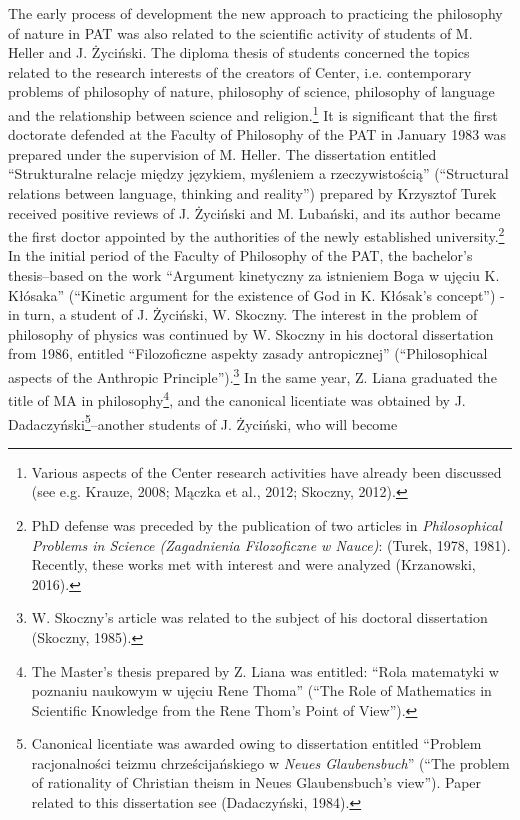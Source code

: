 \documentclass[a4paper]{article}
\begin{document}
The early process of development the new approach to practicing the philosophy of nature in PAT was also related to the
scientific activity of students of M. Heller and J. Życiński. The diploma thesis of students concerned the topics
related to the research interests of the creators of Center, i.e. contemporary problems of philosophy of nature,
philosophy of science, philosophy of language and the relationship between science and religion.\footnote{ Various
aspects of the Center research activities have already been discussed \label{ref:RNDp1PNQqixjX}(see e.g. Krauze, 2008;
Mączka et al., 2012; Skoczny, 2012).} It is significant that the first doctorate defended at the Faculty of Philosophy
of the PAT in January 1983 was prepared under the supervision of M. Heller. The dissertation entitled “Strukturalne
relacje między językiem, myśleniem a rzeczywistością” (“Structural relations between language, thinking and reality”)
prepared by Krzysztof Turek received positive reviews of J. Życiński and M. Lubański, and its author became the first
doctor appointed by the authorities of the newly established university.\footnote{ PhD defense was preceded by the
publication of two articles in \textit{Philosophical Problems in Science (Zagadnienia Filozoficzne w Nauce)}:
\label{ref:RNDKeSlQokX67}(Turek, 1978, 1981). Recently, these works met with interest and were analyzed
\label{ref:RNDyOBxtnZucT}(Krzanowski, 2016).} In the initial period of the Faculty of Philosophy of the PAT, the
bachelor’s thesis–based on the work “Argument kinetyczny za istnieniem Boga w ujęciu K. Kłósaka” (“Kinetic argument for
the existence of God in K. Kłósak's concept”) - in turn, a student of J. Życiński, W. Skoczny. The interest in the
problem of philosophy of physics was continued by W. Skoczny in his doctoral dissertation from 1986, entitled
“Filozoficzne aspekty zasady antropicznej” (“Philosophical aspects of the Anthropic Principle”).\footnote{ W. Skoczny’s
article was related to the subject of his doctoral dissertation \label{ref:RNDrMO3pWFrGD}(Skoczny, 1985).} In the same
year, Z. Liana graduated the title of MA in philosophy\footnote{ The Master’s thesis prepared by Z. Liana was entitled:
“Rola matematyki w poznaniu naukowym w ujęciu Rene Thoma” (“The Role of Mathematics in Scientific Knowledge from the
Rene Thom’s Point of View”).}, and the canonical licentiate was obtained by J. Dadaczyński\footnote{ Canonical
licentiate was awarded owing to dissertation entitled “Problem racjonalności teizmu chrześcijańskiego w \textit{Neues
Glaubensbuch}” (“The problem of rationality of Christian theism in Neues Glaubensbuch's view”). Paper related to this
dissertation see \label{ref:RNDw9cxs50dsK}(Dadaczyński, 1984).}–another students of J. Życiński, who will become
\end{document}
